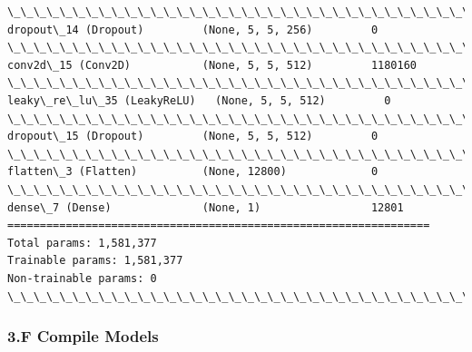 \documentclass[11pt]{article}
\begin{document}
\begin{Verbatim}[commandchars=\\\{\}]
\_\_\_\_\_\_\_\_\_\_\_\_\_\_\_\_\_\_\_\_\_\_\_\_\_\_\_\_\_\_\_\_\_\_\_\_\_\_\_\_\_\_\_\_\_\_\_\_\_\_\_\_\_\_\_\_\_\_\_\_\_\_\_\_\_
dropout\_14 (Dropout)         (None, 5, 5, 256)         0         
\_\_\_\_\_\_\_\_\_\_\_\_\_\_\_\_\_\_\_\_\_\_\_\_\_\_\_\_\_\_\_\_\_\_\_\_\_\_\_\_\_\_\_\_\_\_\_\_\_\_\_\_\_\_\_\_\_\_\_\_\_\_\_\_\_
conv2d\_15 (Conv2D)           (None, 5, 5, 512)         1180160   
\_\_\_\_\_\_\_\_\_\_\_\_\_\_\_\_\_\_\_\_\_\_\_\_\_\_\_\_\_\_\_\_\_\_\_\_\_\_\_\_\_\_\_\_\_\_\_\_\_\_\_\_\_\_\_\_\_\_\_\_\_\_\_\_\_
leaky\_re\_lu\_35 (LeakyReLU)   (None, 5, 5, 512)         0         
\_\_\_\_\_\_\_\_\_\_\_\_\_\_\_\_\_\_\_\_\_\_\_\_\_\_\_\_\_\_\_\_\_\_\_\_\_\_\_\_\_\_\_\_\_\_\_\_\_\_\_\_\_\_\_\_\_\_\_\_\_\_\_\_\_
dropout\_15 (Dropout)         (None, 5, 5, 512)         0         
\_\_\_\_\_\_\_\_\_\_\_\_\_\_\_\_\_\_\_\_\_\_\_\_\_\_\_\_\_\_\_\_\_\_\_\_\_\_\_\_\_\_\_\_\_\_\_\_\_\_\_\_\_\_\_\_\_\_\_\_\_\_\_\_\_
flatten\_3 (Flatten)          (None, 12800)             0         
\_\_\_\_\_\_\_\_\_\_\_\_\_\_\_\_\_\_\_\_\_\_\_\_\_\_\_\_\_\_\_\_\_\_\_\_\_\_\_\_\_\_\_\_\_\_\_\_\_\_\_\_\_\_\_\_\_\_\_\_\_\_\_\_\_
dense\_7 (Dense)              (None, 1)                 12801     
=================================================================
Total params: 1,581,377
Trainable params: 1,581,377
Non-trainable params: 0
\_\_\_\_\_\_\_\_\_\_\_\_\_\_\_\_\_\_\_\_\_\_\_\_\_\_\_\_\_\_\_\_\_\_\_\_\_\_\_\_\_\_\_\_\_\_\_\_\_\_\_\_\_\_\_\_\_\_\_\_\_\_\_\_\_

    \end{Verbatim}

    \hypertarget{f-compile-models}{%
\subsubsection{3.F Compile Models}\label{f-compile-models}}
\end{document}
